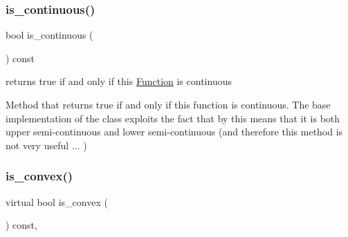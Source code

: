 \mbox{\label{class_s_m_spp__di__unipi__it_1_1_function_a59de57710aa301d293e9126e3fb975bf}} 
\subsubsection{\texorpdfstring{is\+\_\+continuous()}{is\_continuous()}}
{\footnotesize\ttfamily bool is\+\_\+continuous (\begin{DoxyParamCaption}\item[{void}]{ }\end{DoxyParamCaption}) const\hspace{0.3cm}{\ttfamily [inline]}}



returns true if and only if this \mbox{\hyperlink{class_s_m_spp__di__unipi__it_1_1_function}{Function}} is continuous 

Method that returns true if and only if this function is continuous. The base implementation of the class exploits the fact that by this means that it is both upper semi-\/continuous and lower semi-\/continuous (and therefore this method is not very useful ... ) \mbox{\label{class_s_m_spp__di__unipi__it_1_1_function_a8eac4d4ff5bcf2e564138655ee01ece8}} 
\subsubsection{\texorpdfstring{is\+\_\+convex()}{is\_convex()}}
{\footnotesize\ttfamily virtual bool is\+\_\+convex (\begin{DoxyParamCaption}\item[{void}]{ }\end{DoxyParamCaption}) const\hspace{0.3cm}{\ttfamily [inline]}, {\ttfamily [virtual]}}



